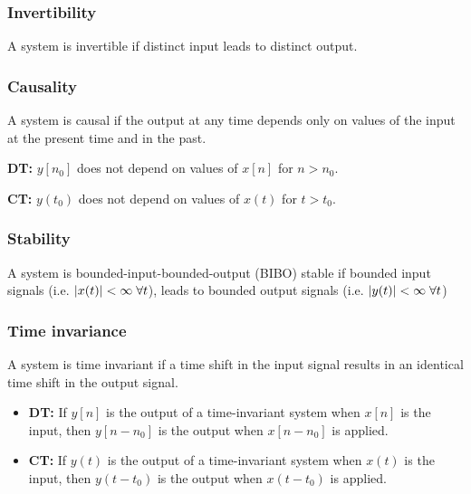     \subsubsection{Invertibility}
    \begin{definition}
        A system is invertible if distinct input leads to distinct output.
    \end{definition}

    \subsubsection{Causality}
    \begin{definition}
        A system is causal if the output at any time depends only on values of the input at the present time and in the past.
        \vspace{1em}

        \textbf{DT:} $y[n_0]$ does not depend on values of $x[n]$ for $n > n_0$.

        \vspace{1em}
        
        \textbf{CT:} $y(t_0)$ does not depend on values of $x(t)$ for $t > t_0$.
        
    \end{definition}

    \subsubsection{Stability}
    \begin{definition}
        A system is bounded-input-bounded-output (BIBO) stable if bounded input signals (i.e. $\abs{x(t)} < \infty \; \forall t$), leads to bounded output signals (i.e. $\abs{y(t)} < \infty \; \forall t$)
        
    \end{definition}

    \subsubsection{Time invariance}
    \begin{definition}
        A system is time invariant if a time shift in the input signal results in an identical time shift in the output signal.
        \begin{itemize}
            \item \textbf{DT:} If $y[n]$ is the output of a time-invariant system when $x[n]$ is the input, then $y[n - n_0]$ is the output when $x[n - n_0]$ is applied.
            \item \textbf{CT:} If $y(t)$ is the output of a time-invariant system when $x(t)$ is the input, then $y(t - t_0)$ is the output when $x(t - t_0)$ is applied.
        \end{itemize}        
    \end{definition}

